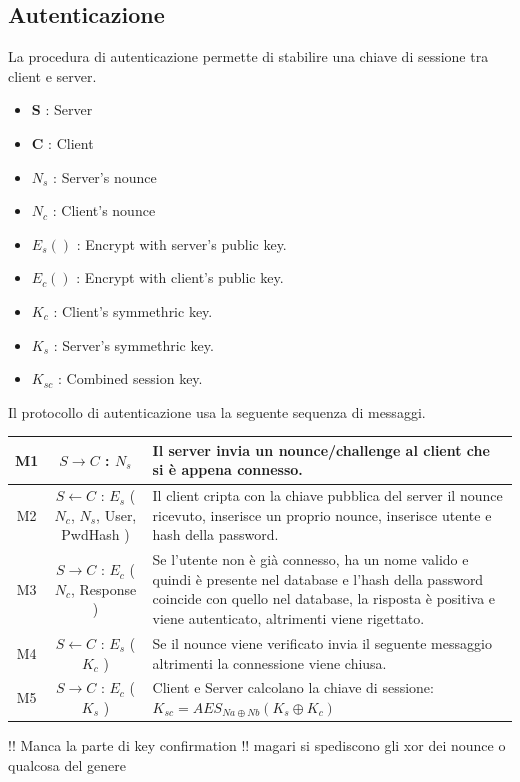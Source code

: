 \documentclass[a4paper,titlepage]{article}
\begin{document}
\subsection{Autenticazione}
La procedura di autenticazione permette di stabilire una chiave di sessione tra client e server.
\begin{itemize}
\item \textbf{S} : Server
\item \textbf{C} : Client
\item $N_s$ : Server's nounce
\item $N_c$ : Client's nounce
\item $E_{s} ()$ : Encrypt with server's public key. 
\item $E_{c} ()$ : Encrypt with client's public key.
\item $K_c$ : Client's symmethric key.
\item $K_s$ : Server's symmethric key.
\item $K_{sc}$ : Combined session key.
\end{itemize}
Il protocollo di autenticazione usa la seguente sequenza di messaggi.
\begin{center}
    \begin{tabular}{ | c | c | p{6cm} |}
    \hline
    M1 & $S \rightarrow C$ : $N_s$ & Il server invia un nounce/challenge al client che si è appena connesso. \\ \hline
    M2 & $S \leftarrow C$ : $E_{s}$ ( $N_c$, $N_s$, User, PwdHash ) & Il client cripta con la chiave pubblica del server il nounce ricevuto, inserisce un proprio nounce, inserisce utente e hash della password. \\ \hline
    M3 & $S \rightarrow C$ : $E_{c}$ ( $N_c$, Response ) & Se l'utente non è già connesso, ha un nome valido e quindi è presente nel database e l'hash della password coincide con quello nel database, la risposta è positiva e viene autenticato, altrimenti viene rigettato. \\ \hline
    M4 & $S \leftarrow C$ : $E_{s}$ ( $K_c$ ) & Se il nounce viene verificato invia il seguente messaggio altrimenti la connessione viene chiusa.\\ \hline
    M5 & $S \rightarrow C$ : $E_{c}$ ( $K_s$ ) & Client e Server calcolano la chiave di sessione: $ K_{sc} = AES_{Na \oplus Nb}(K_s \oplus K_c) $ \\ \hline %
    \end{tabular}
\end{center}
!! Manca la parte di key confirmation !! magari si spediscono gli xor dei nounce o qualcosa del genere\\
\end{document}
